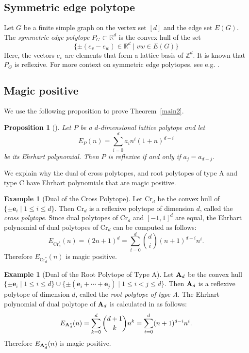 \documentclass[a4paper,reqno,11pt, oneside]{amsart}
\newcommand{\ZZ}{\mathbb{Z}}
\newcommand{\RR}{\mathbb{R}}
\newcommand{\eb}{\mathbf{e}}
\newtheorem{prop}[thm]{Proposition}
\theoremstyle{definition}
\newtheorem{ex}[thm]{Example}
\theoremstyle{remark}
\begin{document}
\subsection{Symmetric edge polytope}
Let $G$ be a finite simple graph on the vertex set $[d]$ and the edge set $E(G)$. The \textit{symmetric edge polytope} $P_G \subset \RR^d$ is the convex hull of the set
$$\{\pm(e_v-e_w) \in \RR^d \mid vw \in E(G)\}$$
Here, the vectors $e_v$ are elements that form a lattice basis of $\ZZ^d$. It is known that \cite{OH14} $P_G$ is reflexive. For more context on symmetric edge polytopes, see e.g. \cite{HJM, MHNOH}.

\subsection{Magic positive}
We use the following proposition to prove Theorem~\ref{main2}.
\begin{prop}[{\cite[Proposition 4.11]{BJM}}]
Let $P$ be a $d$-dimensional lattice polytope and let 
$$E_{P}(n) = \sum _{i=0}^da_in^i(1+n)^{d-i}$$
be its Ehrhart polynomial. Then $P$ is reflexive if and only if $a_j=a_{d-j}$.
\end{prop}

We explain why the dual of cross polytopes, and root polytopes of type A and type C have Ehrhart polynomials that are magic positive.

\begin{ex}[Dual of the Cross Polytope]\label{cross}
Let $\mathrm{Cr}_d$ be the convex hull of $\{\pm \eb_i \mid 1 \leq i \leq d\}$. 
Then $\mathrm{Cr}_d$ is a reflexive polytope of dimension $d$, called the \textit{cross polytope}.
Since dual polytopes of $\mathrm{Cr}_d$ and $[-1,1]^d$ are equal, the Ehrhart polynomial of dual polytopes of $\mathrm{Cr}_d$ can be computed as follows: 
$$E_{\mathrm{Cr}_d^\ast}(n)=(2n+1)^d=\sum_{i=0}^{d}\binom{d}{i}(n+1)^{d-i}n^i.$$
Therefore $E_{\mathrm{Cr}_d^\ast}(n)$ is magic positive.
\end{ex}

\begin{ex}[Dual of the Root Polytope of Type A]\label{typeA}
Let ${\bf A}_d$ be the convex hull $\{\pm \eb_i \mid 1 \leq i \leq d\} \cup \{ \pm (\eb_i+\cdots+\eb_j) \mid 1 \leq i < j \leq d\}$. 
Then ${\bf A}_d$ is a reflexive polytope of dimension $d$, called the \textit{root polytope of type A}. 
The Ehrhart polynomial of dual polytope of ${\bf A}_d$ is calculated in \cite[Lemma 5.3]{HKM} as follows:
$$E_{{\bf A}_d^\ast}(n)=\sum_{k=0}^d \binom{d+1}{k}n^k=\sum_{i=0}^d (n+1)^{d-i}n^i.$$
Therefore $E_{{\bf A}_d^\ast}(n)$ is magic positive.
\end{ex}
\end{document}
